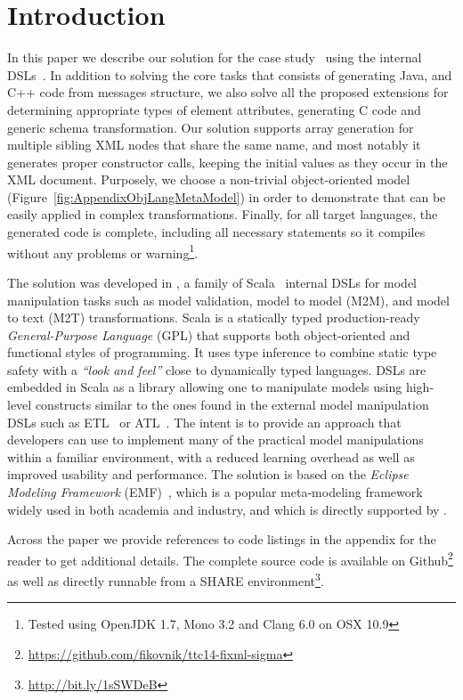 

\section{Introduction}
\label{sec:Introduction}

In this paper we describe our solution for the \TTC \FIXML case study~\cite{Lano2014} using the \SIGMA internal DSLs~\cite{Krikava2014}.
In addition to solving the core tasks that consists of generating Java, \Csharp and C++ code from \FIXML messages structure, we also solve all the proposed extensions for determining appropriate types of element attributes, generating C code and generic \FIXML schema transformation.
Our solution supports array generation for multiple sibling XML nodes that share the same name, and most notably it generates proper constructor calls, keeping the initial values as they occur in the XML document.
Purposely, we choose a non-trivial object-oriented model (\Cf Figure~\ref{fig:AppendixObjLangMetaModel}) in order to demonstrate that \SIGMA can be easily applied in complex transformations.
Finally, for all target languages, the generated code is complete, including all necessary statements so it compiles without any problems or warning\footnote{Tested using OpenJDK 1.7, Mono 3.2 and Clang 6.0 on OSX 10.9}.

The solution was developed in \SIGMA, a family of Scala~\cite{Odersky2004} internal DSLs for model manipulation tasks such as model validation, model to model (M2M), and model to text (M2T) transformations.
Scala is a statically typed production-ready \emph{General-Purpose Language} (GPL) that supports both object-oriented and functional styles of programming.
It uses type inference to combine static type safety with a \emph{``look and feel''} close to dynamically typed languages.
\SIGMA DSLs are embedded in Scala as a library allowing one to manipulate models using high-level constructs similar to the ones found in the external model manipulation DSLs such as ETL~\cite{Kolovos2008a} or ATL~\cite{Jouault2006}.
The intent is to provide an approach that developers can use to implement many of the practical model manipulations within a familiar environment, with a reduced learning overhead as well as improved usability and performance.
The solution is based on the \emph{Eclipse Modeling Framework} (EMF)~\cite{EMF}, which is a popular meta-modeling framework widely used in both academia and industry, and which is directly supported by \SIGMA.

Across the paper we provide references to code listings in the appendix for the reader to get additional details.
The complete source code is available on Github\footnote{\url{https://github.com/fikovnik/ttc14-fixml-sigma}} as well as directly runnable from a SHARE environment\footnote{\url{http://bit.ly/1sSWDeB}}.